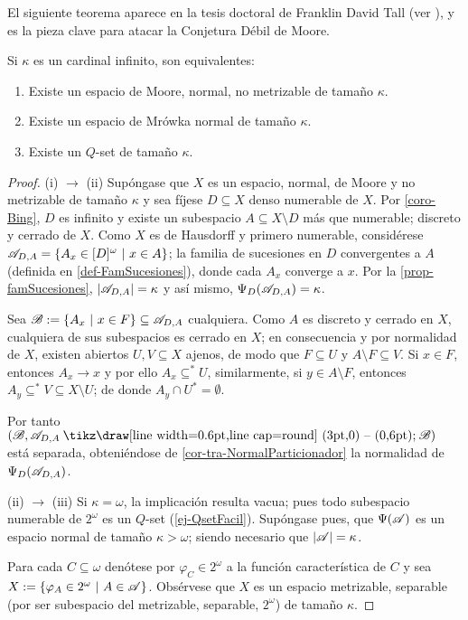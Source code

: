 El siguiente teorema aparece en la tesis doctoral de Franklin David Tall (ver \cite{tallTesis}), y es la pieza clave para atacar la Conjetura Débil de Moore.

\begin{teorema}[Tall]\label{teo-EquivPDM}
	Si $\kappa$ es un cardinal infinito, son equivalentes:
	\begin{enumerate}
		\item Existe un espacio de Moore, normal, no metrizable de tamaño $\kappa$.
		\item Existe un espacio de Mrówka normal de tamaño $\kappa$.
		\item Existe un $Q$-set de tamaño $\kappa$.
	\end{enumerate}
\end{teorema}
\begin{proof}
	(i) $\to$ (ii) Supóngase que $X$ es un espacio, normal, de Moore y no metrizable de tamaño $\kappa$ y sea fíjese $D\subseteq X$ denso numerable de $X$. Por \ref{coro-Bing}, $D$ es infinito y existe un subespacio $A \subseteq X \setminus D$ más que numerable; discreto y cerrado de $X$. Como $X$ es de Hausdorff y primero numerable, considérese $ \mathscr{A}_{D,A}=\{A_x \in [D]^\omega \text{ $|$ } x \in A\} $; la familia de sucesiones en $D$ convergentes a $A$ (definida en \ref{def-FamSucesiones}), donde cada $A_x$ converge a $x$. Por la \autoref{prop-famSucesiones}, $|\mathscr{A}_{D,A}|=\kappa$ y así mismo, $\Psi_D(\mathscr{A}_{D,A})=\kappa$.

	Sea $\mathscr{B}:=\{A_x \text{ $|$ } x \in F\} \subseteq \mathscr{A}_{D,A}$ cualquiera. Como $A$ es discreto y cerrado en $X$, cualquiera de sus subespacios es cerrado en $X$; en consecuencia y por normalidad de $X$, existen abiertos $U,V \subseteq X$ ajenos, de modo que $F \subseteq U$ y $A \setminus F \subseteq V$. Si $x \in F$, entonces $A_x \to x$ y por ello $A_x \subseteq^* U$, similarmente, si $y \in A \setminus F$, entonces $A_y \subseteq^* V \subseteq X \setminus U$; de donde $A_y \cap U^* = \emptyset$.

	Por tanto $(\ms{B}, \ms{A}_{D,A} \setminus \ms{B})$ está separada, obteniéndose de \ref{cor-tra-NormalParticionador} la normalidad de $\Psi_D(\mathscr{A}_{D,A})$.

	(ii) $\to$ (iii) Si $\kappa = \omega$, la implicación resulta vacua; pues todo subespacio numerable de $2^\omega$ es un $Q$-set (\autoref{ej-QsetFacil}). Supóngase pues, que $\Psi(\mathscr{A})$ es un espacio normal de tamaño $\kappa>\omega$; siendo necesario que $|\mathscr{A}|=\kappa$.

	Para cada $C \subseteq \omega$ denótese por $\varphi_C \in 2^ \omega$ a la función característica de $C$ y sea $X:=\{\varphi_A \in 2^\omega \text{ $|$ } A \in \mathscr{A} \}$. Obsérvese que $X$ es un espacio metrizable, separable (por ser subespacio del metrizable, separable, $2^\omega$) de tamaño $\kappa$.


\end{proof}
